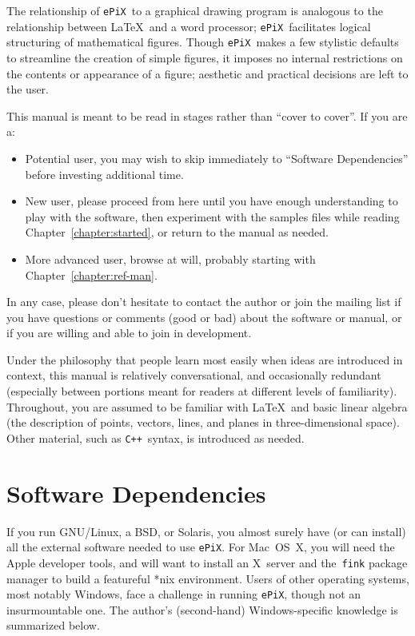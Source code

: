 \documentclass[12pt]{report}
\newcommand{\code}[1]{\texttt{#1}}
\newcommand{\ePiX}{\code{ePiX}}
\newcommand{\CXX}{\code{C++}}
\newcommand{\bi}{\begin{itemize}}
\newcommand{\ei}{\end{itemize}}
\begin{document}
The relationship of \ePiX\ to a graphical drawing program is analogous
to the relationship between \LaTeX\ and a word processor; \ePiX\ 
facilitates logical structuring of mathematical figures. Though \ePiX\ 
makes a few stylistic defaults to streamline the creation of simple
figures, it imposes no internal restrictions on the contents or
appearance of a figure; aesthetic and practical decisions are left to
the user.

This manual is meant to be read in stages rather than ``cover to
cover''. If you are a:

\bi

\item Potential user, you may wish to skip immediately to ``Software
Dependencies'' before investing additional time.

\item New user, please proceed from here until you have enough
  understanding to play with the software, then experiment with the
  samples files while reading Chapter~\ref{chapter:started}, or return
  to the manual as needed.

\item More advanced user, browse at will, probably starting with
  Chapter~\ref{chapter:ref-man}.

\ei

In any case, please don't hesitate to contact the author or join the
mailing list if you have questions or comments (good or bad) about the
software or manual, or if you are willing and able to join in
development.

Under the philosophy that people learn most easily when ideas are
introduced in context, this manual is relatively conversational, and
occasionally redundant (especially between portions meant for readers
at different levels of familiarity). Throughout, you are assumed to be
familiar with \LaTeX\ and basic linear algebra (the description of
points, vectors, lines, and planes in three-dimensional space). Other
material, such as \CXX\ syntax, is introduced as needed.


\section{Software Dependencies}

 If you run GNU/Linux, a BSD, or Solaris, you
almost surely have (or can install) all the external software needed
to use \ePiX.  For Mac~OS~X,\index{Mac OS X} you will need the Apple
developer tools, and will want to install an X~server and
the~\code{fink} package manager to build a featureful *nix
environment.  Users of other operating systems, most notably Windows,
face a challenge in running \ePiX, though not an insurmountable one.
The author's (second-hand) Windows-specific knowledge is summarized
below.
\end{document}
